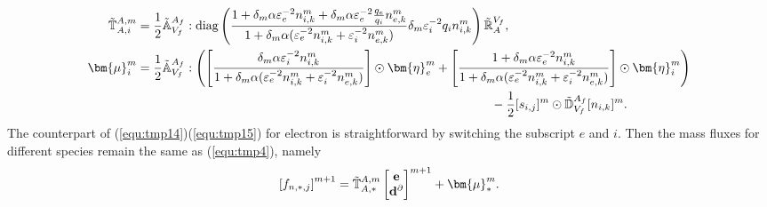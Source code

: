 \documentclass{article}
\begin{document}
\begin{align}
     \Tilde{\mathbb{T}}_{A, i}^{A, m} &= \frac{1}{2} \Tilde{\mathbb{A}}_{V_f}^{A_f} : \text{diag}\left(\frac{1 + \delta_m \alpha \varepsilon_e^{-2} n_{i,k}^m + \delta_m \alpha \varepsilon_e^{-2} \frac{q_e}{q_i}n_{e,k}^m }{1 + \delta_m \alpha (\varepsilon^{-2}_e n_{i,k}^m + \varepsilon_i^{-2} n_{e,k}^m)}\delta_m \varepsilon^{-2}_i q_i n^m_{i,k}\right) \Tilde{\mathbb{R}}^{V_f}_{A}, \label{equ:tmp14} \\
     \bm{\mu}^m_i &= \frac{1}{2}\Tilde{\mathbb{A}}_{V_f}^{A_f} :\left(\left[\frac{\delta_m \alpha \varepsilon_i^{-2} n_{i,k}^m}{1 + \delta_m \alpha (\varepsilon^{-2}_e n_{i,k}^m + \varepsilon^{-2}_i n_{e,k}^m)}\right] \odot \bm{\eta}_e^m + \left[\frac{1 + \delta_m \alpha \varepsilon^{-2}_e n_{i,k}^m}{1 + \delta_m \alpha (\varepsilon^{-2}_e n_{i,k}^m + \varepsilon^{-2}_i n_{e,k}^m)}\right] \odot \bm{\eta}_i^m \right) \nonumber \\
     &\hspace{10cm} - \frac{1}{2} [s_{i,j}]^m \odot \Tilde{\mathbb{D}}_{V_f}^{A_f} [n_{i,k}]^m. \label{equ:tmp15}
\end{align}
The counterpart of (\ref{equ:tmp14})(\ref{equ:tmp15}) for electron is straightforward by switching the subscript $e$ and $i$. Then the mass fluxes for different species remain the same as (\ref{equ:tmp4}), namely
\begin{equation}
    \left[f_{n,*,j}\right]^{m+1} = \Tilde{\mathbb{T}}_{A,*}^{A,m} 
    \begin{bmatrix}
    \mathbf{e} \\
    \mathbf{d}^\partial 
    \end{bmatrix}^{m+1} + \bm{\mu}^m_*.
\end{equation} 
\end{document}
